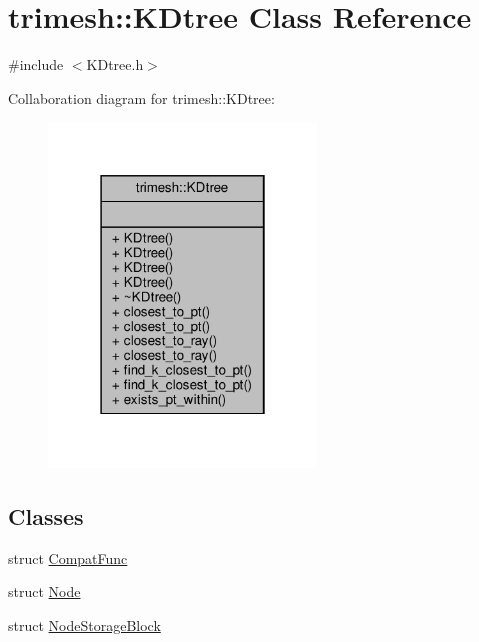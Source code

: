 \hypertarget{classtrimesh_1_1KDtree}{}\section{trimesh\+:\+:K\+Dtree Class Reference}
\label{classtrimesh_1_1KDtree}


{\ttfamily \#include $<$K\+Dtree.\+h$>$}



Collaboration diagram for trimesh\+:\+:K\+Dtree\+:\nopagebreak
\begin{figure}[H]
\begin{center}
\leavevmode
\includegraphics[width=202pt]{db/d0c/classtrimesh_1_1KDtree__coll__graph}
\end{center}
\end{figure}
\subsection*{Classes}
\begin{DoxyCompactItemize}
\item 
struct \hyperlink{structtrimesh_1_1KDtree_1_1CompatFunc}{Compat\+Func}
\item 
struct \hyperlink{structtrimesh_1_1KDtree_1_1Node}{Node}
\item 
struct \hyperlink{structtrimesh_1_1KDtree_1_1NodeStorageBlock}{Node\+Storage\+Block}
\end{DoxyCompactItemize}
